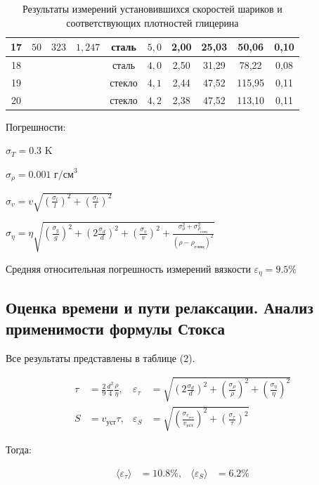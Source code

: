 \documentclass[a4paper]{article}
\begin{document}
\begin{table}[h!]
\begin{tabular}{|c|c|c|c|c|c|c|c|c|c|}
    17  & $50$ & $323$ & $1,247$ & сталь  &  $5,0$ & 2,00 & 25,03 & 50,06 & 0,10 \\ \hline
    18  &      &       &         & сталь  &  $4,0$ & 2,50 & 31,29 & 78,22 & 0,08 \\ \hline
    19  &      &       &         & стекло &  $4,1$ & 2,44 & 47,52 & 115,95 & 0,11 \\ \hline
    20  &      &       &         & стекло &  $4,2$ & 2,38 & 47,52 & 113,10 & 0,11 \\ \hline

    \end{tabular}
    \caption{Результаты измерений установившихся скоростей шариков и соответствующих плотностей глицерина}
    \end{table}

    Погрешности:

    $\sigma_T = 0.3 \text{ K}$

    $\sigma_{\rho} = 0.001\text{ г/см}^3$

    $\sigma_v = v\sqrt{\left( \frac{\sigma_l}{l}\right)^2 + \left(\frac{\sigma_{t}}{t} \right)^2}$

    $\sigma_{\eta} = \eta \sqrt{\left( \frac{\sigma_g}{g}\right)^2 + \left( 2\frac{\sigma_d}{d}\right)^2 + \left( \frac{\sigma_{v}}{v}\right)^2 + \frac{\sigma_{\rho}^2 + \sigma_{\rho_{глиц}}^2}{(\rho - \rho_{глиц})^2}}$


    Средняя относительная погрешность измерений вязкости $\varepsilon_{\eta} = 9.5\% $

    \subsection{Оценка времени и пути релаксации. Анализ применимости формулы Стокса}

    Все результаты представлены в таблице (2).

    \begin{align}
        \tau &= \frac{2}{9} \frac{d^2}{4} \frac{\rho}{\eta}, & \varepsilon_{\tau} &= \sqrt{\left( 2\frac{\sigma_d}{d} \right)^2  + \left( \frac{\sigma_{\rho}}{\rho} \right)^2 + \left( \frac{\sigma_{\eta}}{\eta} \right)^2}\label{relax_time}\\
        S &= v_{уст} \tau, & \varepsilon_S &= \sqrt{\left( \frac{\sigma_{v_{уст}}}{v_{уст}} \right)^2  + \left( \frac{\sigma_{\tau}}{\tau} \right)^2}\label{S}
    \end{align}

    Тогда:

    \begin{align*}
        \langle \varepsilon_{\tau} \rangle &= 10.8\%, & \langle \varepsilon_S \rangle &= 6.2\%
    \end{align*}
\end{document}

